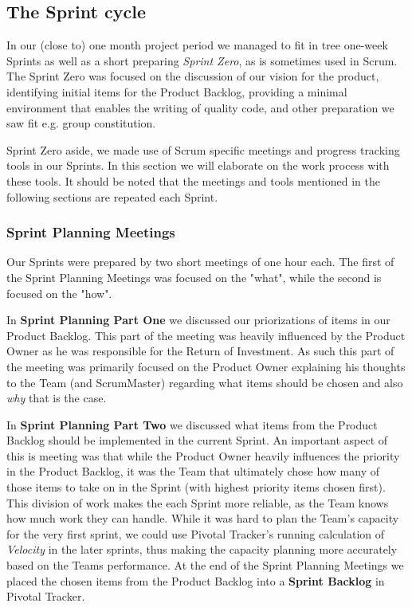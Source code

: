 \subsection{The Sprint cycle}

In our (close to) one month project period we managed to fit in tree one-week Sprints as well as a short preparing \textit{Sprint Zero}, as is sometimes used in Scrum. The Sprint Zero was focused on the discussion of our vision for the product, identifying initial items for the Product Backlog, providing a minimal environment that enables the  writing of quality code, and other preparation we saw fit e.g. group constitution.

Sprint Zero aside, we made use of Scrum specific meetings and progress tracking tools in our Sprints. In this section we will elaborate on the work process with these tools. It should be noted that the meetings and tools mentioned in the following sections are repeated each Sprint.


\subsubsection{Sprint Planning Meetings} 
Our Sprints were prepared by two short meetings of one hour each. The first of the Sprint Planning Meetings was focused on the "what", while the second is focused on the "how".

In \textbf{Sprint Planning Part One}  we discussed our priorizations of items in our Product Backlog. This part of the meeting was heavily influenced by the Product Owner as he was responsible for the Return of Investment. As such this part of the meeting was primarily focused on the Product Owner explaining his thoughts to the Team (and ScrumMaster) regarding what items should be chosen and also \textit{why} that is the case.

In \textbf{Sprint Planning Part Two} we discussed what items from the Product Backlog should be implemented in the current Sprint. An important aspect of this is meeting was that while the Product Owner heavily influences the priority in the Product Backlog, it was the Team that ultimately chose how many of those items to take on in the Sprint (with highest priority items chosen first). This division of work makes the each Sprint more reliable, as the Team knows how much work they can handle. While it was hard to plan the Team's capacity for the very first sprint, we could use Pivotal Tracker's running calculation of \textit{Velocity} in the later sprints, thus making the capacity planning more accurately based on the Teams performance.
 At the end of the Sprint Planning Meetings we placed the chosen items from the Product Backlog into a \textbf{Sprint Backlog} in Pivotal Tracker.

